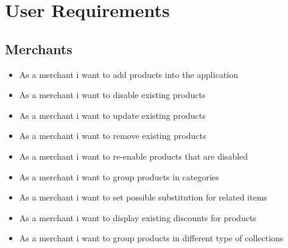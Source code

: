 \section{User Requirements}
\subsection{Merchants}
\begin{itemize}
    \item As a merchant i want to add products into the application
    \item As a merchant i want to disable existing products
    \item As a merchant i want to update existing products
    \item As a merchant i want to remove existing products
    \item As a merchant i want to re-enable products that are disabled
    \item As a merchant i want to group products in categories
    \item As a merchant i want to set possible substitution for related items
    \item As a merchant i want to display existing discounts for products
    \item As a merchant i want to group products in different type of 
    collections
\end{itemize}
